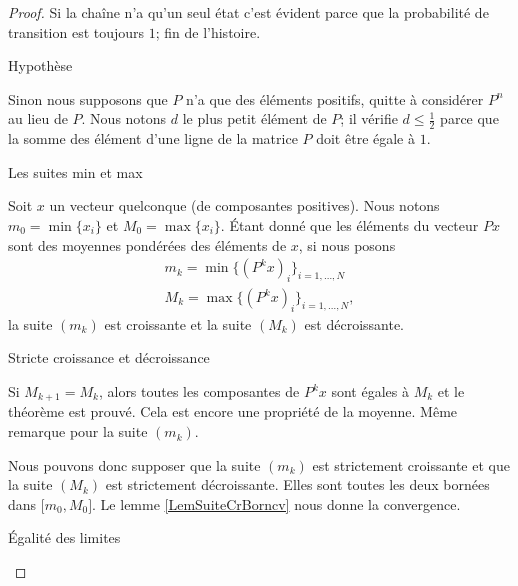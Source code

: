 \begin{proof}
    Si la chaîne n'a qu'un seul état c'est évident parce que la probabilité de transition est toujours \( 1\); fin de l'histoire.

    \begin{subproof}
        \item[Hypothèse]

            Sinon nous supposons que \( P\) n'a que des éléments positifs, quitte à considérer \( P^n\) au lieu de \( P\). Nous notons \( d\) le plus petit élément de \( P\); il vérifie \( d\leq \frac{ 1 }{2}\) parce que la somme des élément d'une ligne de la matrice \( P\) doit être égale à \( 1\).

        \item[Les suites min et max]

            Soit \( x\) un vecteur quelconque (de composantes positives). Nous notons \( m_0=\min\{ x_i \}\) et \( M_0=\max\{ x_i \}\). Étant donné que les éléments du vecteur \( Px\) sont des moyennes pondérées des éléments de \( x\), si nous posons
            \begin{subequations}
                \begin{align}
                    m_k=\min\{ (P^kx)_i \}_{i=1,\ldots, N}\\
                    M_k=\max\{ (P^kx)_i \}_{i=1,\ldots, N},
                \end{align}
            \end{subequations}
            la suite \( (m_k)\) est croissante et la suite \( (M_k)\) est décroissante.

        \item[Stricte croissance et décroissance]

            Si \( M_{k+1}=M_k\), alors toutes les composantes de \( P^kx\) sont égales à \( M_k\) et le théorème est prouvé. Cela est encore une propriété de la moyenne. Même remarque pour la suite \( (m_k)\).

            Nous pouvons donc supposer que la suite \( (m_k)\) est strictement croissante et que la suite \( (M_k)\) est strictement décroissante. Elles sont toutes les deux bornées dans \( \mathopen[ m_0 , M_0 \mathclose]\). Le lemme \ref{LemSuiteCrBorncv} nous donne la convergence.

        \item[Égalité des limites]


\end{subproof}
\end{proof}
